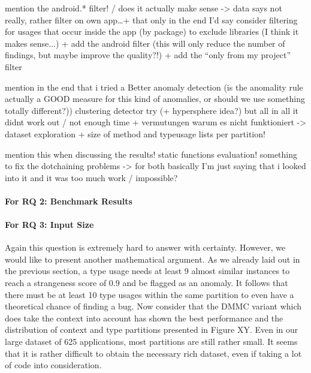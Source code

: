 mention the android.* filter! / does it actually make sense -> data says not really, rather filter on own app\ldots + that only in the end I'd say
consider filtering for usages that occur inside the app (by package) to exclude libraries (I think it makes sense...)
+ add the android filter (this will only reduce the number of findings, but maybe improve the quality?!)
+ add the ``only from my project'' filter

mention in the end that i tried a 
Better anomaly detection (is the anomality rule actually a GOOD measure for this kind of anomalies, or should we use something totally different?))
    clustering detector try (+ hypersphere idea?)
    but all in all it didnt work out / not enough time
    + vermutungen warum es nicht funktioniert -> dataset exploration + size of method and typeusage lists per partition!

mention this when discussing the results!
    static functions evaluation!
    something to fix the dotchaining problems
    -> for both basically I'm just saying that i looked into it and it was too much work / impossible?

\paragraph{For RQ 2: Benchmark Results}


\paragraph{For RQ 3: Input Size}

Again this question is extremely hard to answer with certainty.
However, we would like to present another mathematical argument. 
As we already laid out in the previous section, a type usage needs at least 9 almost similar instances to reach a strangeness score of 0.9 and be flagged as an anomaly.
It follows that there must be at least 10 type usages within the same partition to even have a theoretical chance of finding a bug.
Now consider that the $\text{DMMC}$ variant which does take the context into account has shown the best performance and the distribution of context and type partitions presented in Figure XY.
Even in our large dataset of 625 applications, most partitions are still rather small. 
It seems that it is rather difficult to obtain the necessary rich dataset, even if taking a lot of code into consideration.

